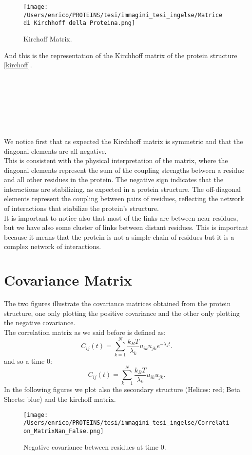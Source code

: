 \documentclass[English, Lau, oneside]{sapthesis}
\begin{document}
\begin{figure}[h!]
    \centering
    \texttt{[image: /Users/enrico/PROTEINS/tesi/immagini\_tesi\_ingelse/Matrice di Kirchhoff della Proteina.png]}\label{fig:kirchoff}
    \caption{Kirchoff Matrix.}
\end{figure}
And this is the representation of the Kirchhoff matrix of the protein structure \ref{kirchoff}.\\
\\\\\\\\\\\\\\
We notice first that as expected the Kirchhoff matrix is symmetric and that the diagonal elements are all negative. \\
This is consistent with the physical interpretation of the matrix, where the diagonal elements represent the sum of the coupling strengths between a residue and all other residues in the protein. The negative sign indicates that the interactions are stabilizing, as expected in a protein structure. The off-diagonal elements represent the coupling between pairs of residues, reflecting the network of interactions that stabilize the protein's structure.\\
It is important to notice also that most of the links are between near residues, but we have also some cluster of links between distant residues. This is important because it means that the protein is not a simple chain of residues but it is a complex network of interactions.
\newpage
\section{Covariance Matrix}
\noindent The two figures illustrate the covariance matrices obtained from the protein structure, one only plotting the positive covariance and the other only plotting the negative covariance.\\
The correlation matrix as we said before is defined as:
\[
C_{ij}(t) = \sum_{k=1}^N \frac{k_B T}{\lambda_k} u_{ik} u_{jk} e^{-\lambda_k t}.
\]
and so a time 0:\\
\[
C_{ij}(t) = \sum_{k=1}^N \frac{k_B T}{\lambda_k} u_{ik} u_{jk}.
\]
In the following figures we plot also the secondary structure (Helices: red; Beta Sheets: blue) and the kirchoff matrix.\\
\begin{figure}[h!]
    \centering
    \texttt{[image: /Users/enrico/PROTEINS/tesi/immagini\_tesi\_ingelse/Correlation\_MatrixNan\_False.png]}
    \caption{Negative covariance between residues at time 0.}
    \label{fig:correlation_negative_figo}
\end{figure}
\end{document}
